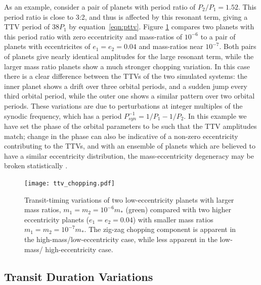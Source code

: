 \documentclass[graybox,natbib,nosecnum]{svmult}
\begin{document}
As an example, consider a pair of planets with period ratio of $P_2/P_1 = 1.52$.  This period ratio
is close to 3:2, and thus is affected by this resonant term, giving a TTV period of $38 P_1$ by equation~\ref{eqn:pttv}.
Figure \ref{ttv_chopping} compares two planets with this period ratio with zero eccentricity
and mass-ratios of $10^{-6}$ to a pair of planets with eccentricites of $e_1=e_2=0.04$
and mass-ratios near $10^{-7}$.  Both pairs of planets give nearly identical amplitudes
for the large resonant term, while the larger mass ratio planets show a much stronger chopping
variation.  In this case there is a clear difference between the TTVs of the two simulated
systems:  the inner planet shows a drift over three orbital periods, and a sudden jump
every third orbital period, while the outer one shows a similar pattern over two orbital
periods.  These variations are due to perturbations at integer multiples of the synodic
frequency, which has a period $P_{syn}^{-1} = 1/P_1-1/P_2$.  In this example we have
set the phase of the orbital parameters to be such that the TTV amplitudes match;  change
in the phase can also be indicative of a non-zero eccentricity contributing to the TTVs,
and with an ensemble of planets which are believed to have a similar eccentricity
distribution, the mass-eccentricity degeneracy may be broken statistically \citep{2012ApJ...761..122L,
2014ApJ...787...80H}.

\begin{figure}
\centerline{
\texttt{[image: ttv\_chopping.pdf]}}
%
\caption{Transit-timing variations of two low-eccentricity planets with larger
mass ratios, $m_1 = m_2 = 10^{-6} m_*$ (green) compared with two higher eccentricity planets ($e_1=e_2=0.04$)
with smaller mass ratios $m_1 = m_2 = 10^{-7} m_*$.  The zig-zag chopping component
is apparent in the high-mass/low-eccentricity case, while less apparent in the low-mass/
high-eccentricity case.}
\label{ttv_chopping}       %
\end{figure}




\subsection{Transit Duration Variations}
\end{document}
